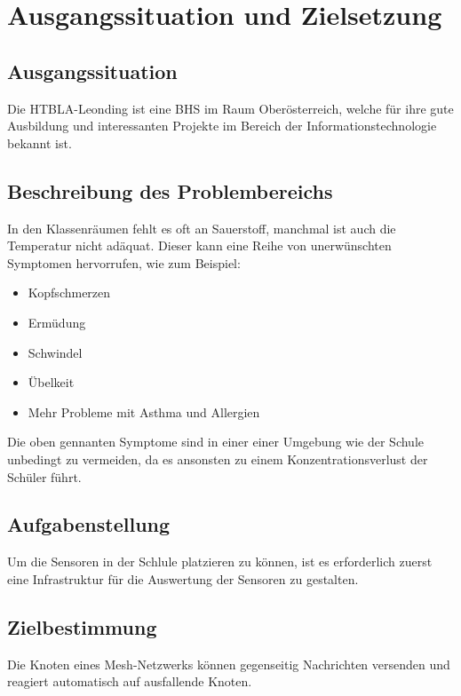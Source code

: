 \chapter{Ausgangssituation und Zielsetzung}

\section{Ausgangssituation}
Die HTBLA-Leonding ist eine BHS im Raum Oberösterreich, welche für ihre gute Ausbildung und interessanten Projekte im Bereich der Informationstechnologie bekannt ist.

\section{Beschreibung des Problembereichs}
In den Klassenräumen fehlt es oft an Sauerstoff, manchmal ist auch die Temperatur nicht adäquat. Dieser kann eine Reihe von unerwünschten Symptomen hervorrufen, wie zum Beispiel: 

\begin{itemize}
    \item Kopfschmerzen
    \item Ermüdung
    \item Schwindel
    \item Übelkeit
    \item Mehr Probleme mit Asthma und Allergien
\end{itemize}

Die oben gennanten Symptome sind in einer einer Umgebung wie der Schule unbedingt zu vermeiden, da es ansonsten zu einem Konzentrationsverlust der Schüler führt.

\pagebreak

\section{Aufgabenstellung}
Um die Sensoren in der Schlule platzieren zu können, ist es erforderlich zuerst eine Infrastruktur für die Auswertung der Sensoren zu gestalten.

\section{Zielbestimmung}
Die Knoten eines Mesh-Netzwerks können gegenseitig Nachrichten versenden und reagiert automatisch auf ausfallende Knoten.